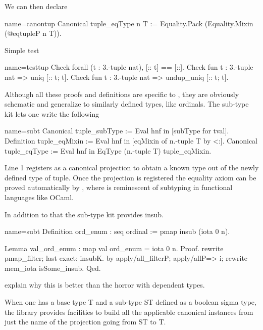 We can then declare

\begin{coq}{name=canontup}{}
Canonical tuple_eqType n T :=
  Equality.Pack (Equality.Mixin (@eqtupleP n T)).
\end{coq}

Simple test

\begin{coq}{name=testtup}{}
Check forall (t : 3.-tuple nat), [:: t] == [::].
Check fun t : 3.-tuple nat => uniq [:: t; t].
Check fun t : 3.-tuple nat => undup_uniq [:: t; t].
\end{coq}

Although all these proofs and definitions are specific to ,
they are obviously schematic and generalize to similarly defined types,
like ordinals.  The sub-type kit lets one write the following

\begin{coq}{name=subt}{}
Canonical tuple_subType := Eval hnf in [subType for tval].
Definition tuple_eqMixin := Eval hnf in [eqMixin of n.-tuple T by <:].
Canonical tuple_eqType := Eval hnf in EqType (n.-tuple T) tuple_eqMixin.
\end{coq}

Line 1 registers  as a canonical projection to obtain a known
type out of the newly defined type of tuple.  Once the projection
is registered the equality axiom can be proved automatically by
, where \C{<:} is reminescent of
subtyping in functional languages like OCaml.

In addition to that the sub-type kit provides insub.

\begin{coq}{name=subt}{}
Definition ord_enum : seq ordinal := pmap insub (iota 0 n).

Lemma val_ord_enum : map val ord_enum = iota 0 n.
Proof.
rewrite pmap_filter; last exact: insubK.
by apply/all_filterP; apply/allP=> i; rewrite mem_iota isSome_insub.
Qed.
\end{coq}

explain why this is better than the horror with dependent types.

\mcbREQUIRE{}

When one has a base type T and a sub-type ST defined as a boolean
sigma type, the \mcbMC{} library provides facilities to
build all the applicable canonical instances from just
the name of the projection going from ST to T.

